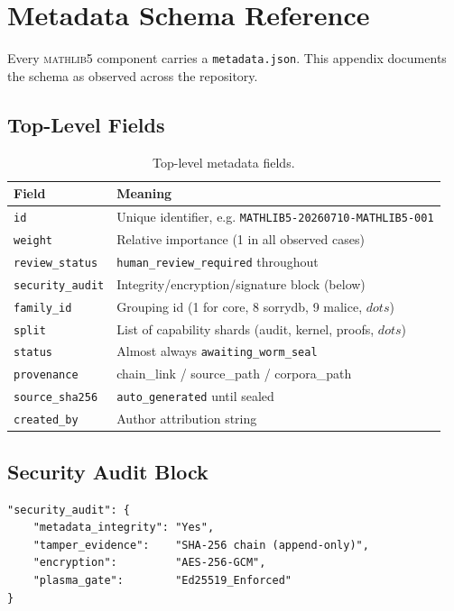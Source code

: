 \chapter{Metadata Schema Reference}
\label{app:metadata}

Every \textsc{mathlib5} component carries a \texttt{metadata.json}. This
appendix documents the schema as observed across the repository.

\section{Top-Level Fields}
\label{app:meta-top}

\begin{table}[H]
\centering
\caption{Top-level metadata fields.}
\label{tab:meta-top}
\begin{tabularx}{\textwidth}{lX}
\toprule
\textbf{Field} & \textbf{Meaning} \\
\midrule
\texttt{id} & Unique identifier, e.g. \texttt{MATHLIB5-20260710-MATHLIB5-001} \\
\texttt{weight} & Relative importance (1 in all observed cases) \\
\texttt{review\_status} & \texttt{human\_review\_required} throughout \\
\texttt{security\_audit} & Integrity/encryption/signature block (below) \\
\texttt{family\_id} & Grouping id (1 for core, 8 sorrydb, 9 malice, \ensuremath{dots}) \\
\texttt{split} & List of capability shards (audit, kernel, proofs, \ensuremath{dots}) \\
\texttt{status} & Almost always \texttt{awaiting\_worm\_seal} \\
\texttt{provenance} & chain\_link / source\_path / corpora\_path \\
\texttt{source\_sha256} & \texttt{auto\_generated} until sealed \\
\texttt{created\_by} & Author attribution string \\
\bottomrule
\end{tabularx}
\end{table}

\section{Security Audit Block}
\label{app:meta-sec}

\begin{verbatim}
"security_audit": {
    "metadata_integrity": "Yes",
    "tamper_evidence":    "SHA-256 chain (append-only)",
    "encryption":         "AES-256-GCM",
    "plasma_gate":        "Ed25519_Enforced"
}
\end{verbatim}

